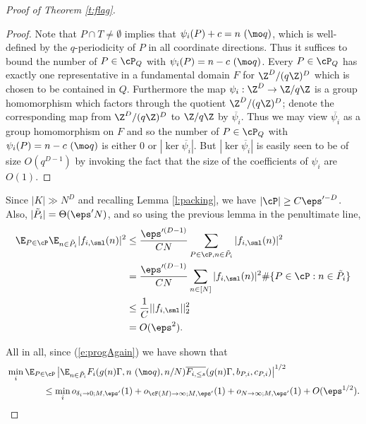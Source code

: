 \begin{proof}[Proof of Theorem \ref{t:flag}]
\begin{proof}
Note that $P\cap T \ne \emptyset$ implies that $\psi_i(P)+c = n \ (\mo q)$, which is well-defined by the $q$-periodicity of $P$ in all coordinate directions. Thus it suffices to bound the number of $P\in \cP_Q$ with $\psi_i(P)= n-c \ (\mo q)$. Every $P\in \cP_Q$ has exactly one representative in a fundamental domain $F$ for $\Z^D/(q\Z)^D$ which is chosen to be contained in $Q$. Furthermore the map $\psi_i : \Z^D \to \Z/q\Z$ is a group homomorphism which factors through the quotient $\Z^D/(q\Z)^D$; denote the corresponding map from $\Z^D/(q\Z)^D$ to $\Z/q\Z$ by $\overline{\psi_i}$. Thus we may view $\overline{\psi_i}$ as a group homomorphism on $F$ and so the number of $P\in \cP_Q$ with $\psi_i(P) = n-c \ (\mo q)$ is either 0 or $|\ker \overline{\psi_i}|$. But $|\ker \overline{\psi_i}| $ is easily seen to be of size $O(q^{D-1})$ by invoking the fact that the size of the coefficients of $\psi_i$ are $O(1)$. 
\end{proof}

Since $|K|\gg N^D$ and recalling Lemma \ref{l:packing}, we have $|\cP| \geq C\eps'^{-D}$. Also, $|\tilde P_i| = \Theta(\eps'N)$, and so using the previous lemma in the penultimate line, 
\begin{align*}
\E_{P \in \cP}\E_{n\in \tilde  P_i} | f_{i,\sml}(n)|^2 &\leq \frac{\eps'^{(D-1)}}{CN}\sum_{P\in \cP,n\in \tilde P_i}| f_{i,\sml}(n)|^2 \\
&= \frac{\eps'^{(D-1)}}{CN}\sum_{n \in [N]}| f_{i,\sml}(n)|^2 \#\{P \in \cP: n \in \tilde P_i\} \\
&\leq  \frac{1}{C}|| f_{i,\sml}||_2^2\\
&= O(\eps^2).
\end{align*}

All in all, since (\ref{e:progAgain}) we have shown that  
\begin{align}\label{e:finalBds}
&\min_i \E_{P \in \cP}\left|\E_{n\in \tilde P_i} F_i( g(n) \Gamma, n \ (\mo q), n/N)\overline{F_{i,\leq s}}( g(n) \Gamma, b_{P,i},c_{P,i})\right|^{1/2} \nonumber \\& \qquad \qquad \leq \min_i o_{\delta_i\to 0;M,\eps'}(1) + o_{\cF(M) \to \infty; M,\eps'}(1) + o_{N\to \infty;M,\eps'}(1)  + O(\eps^{1/2}).
\end{align}



\end{proof}
